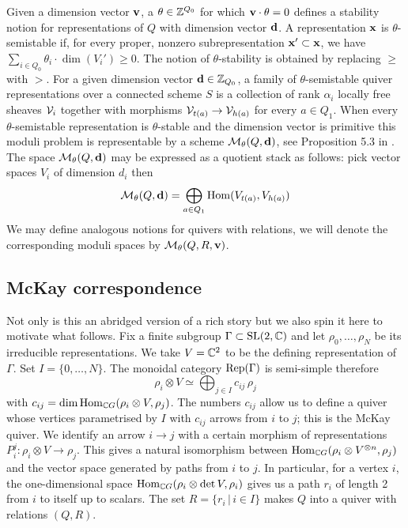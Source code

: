 \documentclass{amsart}
\theoremstyle{definition}
\begin{document}
Given a dimension vector $\mathbf{v}$, a $\theta \in \mathbb{Z}^{Q_0}$ for which $\mathbf{v} \cdot \theta=0$ defines a stability notion for representations of $Q$ with dimension vector $\mathbf{d}$.
A representation $\mathbf{x}$ is $\theta$-semistable if, for every proper, nonzero subrepresentation $\mathbf{x}' \subset \mathbf{x}$, we have $\sum_{i \in Q_0} \theta_i \cdot \dim(V_i') \geq 0$.  
The notion of $\theta$-stability is obtained by replacing $\geq$ with $>$. 
For a given dimension vector $\mathbf{d} \in \mathbb{Z}_{Q_0}$, a family of $\theta$-semistable quiver representations over a connected scheme $S$ is a collection of rank $\alpha_i$ locally free sheaves $\mathcal{V}_i$ together with morphisms $\mathcal{V}_{t(a)} \rightarrow \mathcal{V}_{h(a)}$ for every $a\in Q_1$. 
When every $\theta$-semistable representation is $\theta$-stable and the dimension vector is primitive this moduli problem is representable by a scheme $\mathcal{M}_\theta(Q, \mathbf{d})$, see Proposition 5.3 in \cite{King}.
The space $\mathcal{M}_\theta(Q, \mathbf{d})$ may be expressed as a quotient stack as follows: pick vector spaces $V_i$ of dimension $d_i$ then $$\mathcal{M}_\theta(Q,\mathbf{d}) = \bigoplus_{a \in Q_1} \operatorname{Hom}(V_{t(a)}, V_{h(a)})$$
We may define analogous notions for quivers with relations, we will denote the corresponding moduli spaces by $\mathcal{M}_\theta(Q,R,\mathbf{v})$.

\subsection{McKay correspondence}
Not only is this an abridged version of a rich story but we also spin it here to motivate what follows.
Fix a finite subgroup $\Gamma \subset \operatorname{SL}(2,\mathbb{C})$ and let $\rho_0, \ldots, \rho_N$ be its
irreducible representations. 
We take $V=\mathbb{C}^2$ to be the defining representation of $\Gamma$.
Set $I=\{0,\ldots,N\}$.
The monoidal category $\operatorname{Rep}(\Gamma)$ is semi-simple therefore $$\rho_i \otimes V \simeq \bigoplus_{j \in I} c_{ij} \, \rho_j$$
with $c_{ij} =\dim \operatorname{Hom}_{\mathbb{C} G}(\rho_i \otimes V, \rho_j)$.
The numbers $c_{ij}$ allow us to define a quiver whose vertices parametrised by $I$ with $c_{ij}$ arrows from $i$ to $j$; this is the McKay quiver.
We identify an arrow $i \rightarrow j$ with a certain morphism of representations $P_i^j \colon \rho_i \otimes V \rightarrow \rho_j$.
This gives a natural isomorphism between $\operatorname{Hom}_{\mathbb{C} G}(\rho_i \otimes V^{\otimes n}, \rho_j)$ and the vector space generated by paths from $i$ to $j$.
In particular, for a vertex $i$, the one-dimensional space $\operatorname{Hom}_{\mathbb{C} G} (\rho_i \otimes \operatorname{det}{V}, \rho_i)$ gives us a path $r_i$ of length 2 from $i$ to itself up to scalars.
The set $R = \{r_i \, |\, i \in I\}$ makes $Q$ into a quiver with relations $(Q, R)$. 
\end{document}
